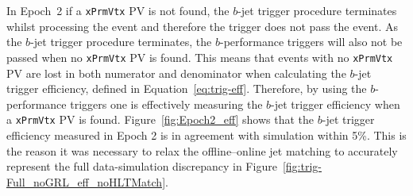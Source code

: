 
In Epoch~2 if a \verb|xPrmVtx| PV is not found, the $b$-jet trigger procedure terminates whilst processing the event and therefore the trigger does not pass the event.
As the $b$-jet trigger procedure terminates, the $b$-performance triggers will also not be passed when no \verb|xPrmVtx| PV is found.
This means that events with no \verb|xPrmVtx| PV are lost in both numerator and denominator when calculating the $b$-jet trigger efficiency, defined in Equation~\ref{eq:trig-eff}.
Therefore, by using the $b$-performance triggers one is effectively measuring the  $b$-jet trigger efficiency when a \verb|xPrmVtx| PV is found.
Figure~\ref{fig:Epoch2_eff} shows that the $b$-jet trigger efficiency measured in Epoch 2 is in agreement with simulation within 5\%.
This is the reason it was necessary to relax the offline--online jet matching to accurately represent the full data-simulation discrepancy in Figure~\ref{fig:trig-Full_noGRL_eff_noHLTMatch}.

